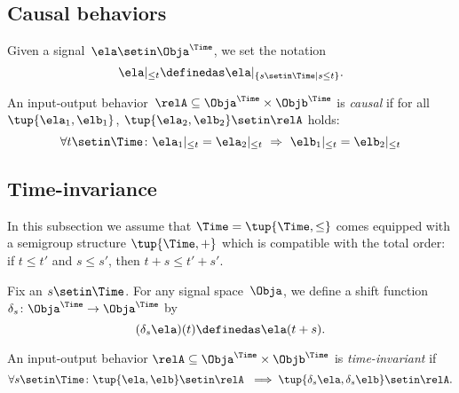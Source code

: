 \subsection{Causal behaviors}

Given a signal~$\ela \setin \Obja^\Time$, we set the notation
\begin{equation}
    \ela \vert_{\leq t} \definedas  \ela \vert_{\{ s \setin \Time \mid s \leq t\}}.
\end{equation}

\begin{definition}
    An input-output behavior~$\relA \subseteq \Obja^\Time \times \Objb^\Time$ is \emph{causal} if for all~$\tup{\ela_1, \elb_1}$, $\tup{\ela_2, \elb_2} \setin \relA$ holds:
    \begin{equation*}
        \forall t \setin \Time\colon \ela_1 \vert_{ \leq t} = \ela_2 \vert_{ \leq t} \  \Rightarrow \ \elb_1 \vert_{ \leq t} = \elb_2 \vert_{ \leq t}
    \end{equation*}
\end{definition}


\subsection{Time-invariance}

In this subsection we assume that $\Time = \tup{\Time, \leq}$ comes equipped with a semigroup structure $\tup{\Time, +}$ which is compatible with the total order: if $t \leq t'$ and $s \leq s'$, then $t + s \leq t' + s'$.

Fix an $s \setin \Time$.
For any signal space~$\Obja$, we define a shift function~$\delta_s\colon \Obja^\Time \to \Obja^\Time$ by
\begin{equation*}
    (\delta_s \ela)(t) \definedas \ela(t + s).
\end{equation*}

\begin{definition}
    An input-output behavior $\relA \subseteq \Obja^\Time \times \Objb^\Time$ is \emph{time-invariant} if
    \begin{equation*}
        \forall s \setin \Time\colon \tup{\ela, \elb} \setin \relA  \ \implies \tup{\delta_s \ela, \delta_s \elb} \setin \relA.
    \end{equation*}
\end{definition}


